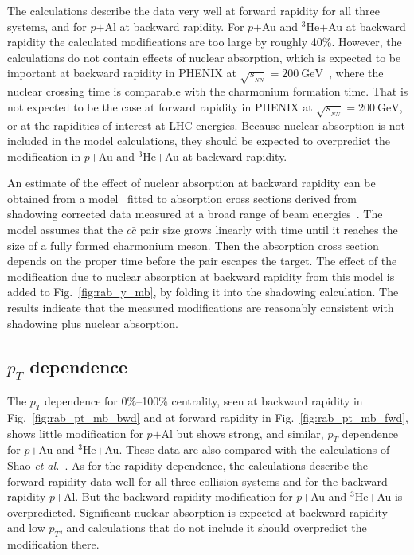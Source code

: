 \documentclass[twocolumn,letterpaper,aps,prc,longbibliography,superscriptaddress,nofootinbib,floatfix]{revtex4-1}
\newcommand{\pt}{\mbox{$p_T$}\xspace}
\newcommand{\sqsntwo}{\mbox{$\sqrt{s_{_{NN}}}=200~\mathrm{GeV}$}\xspace}
\newcommand{\pau}{\mbox{$p$$+$Au}\xspace}
\newcommand{\pal}{\mbox{$p$$+$Al}\xspace}
\newcommand{\heau}{\mbox{$^{3}$He$+$Au}\xspace}
\begin{document}
The calculations describe the data very well at forward rapidity for all 
three systems, and for \pal at backward rapidity. For \pau and \heau at 
backward rapidity the calculated modifications are too large by roughly 
40\%. However, the calculations do not contain effects of nuclear 
absorption, which is expected to be important at backward rapidity in 
PHENIX at \sqsntwo~\cite{McGlinchey:2012bp}, where the nuclear crossing 
time is comparable with the charmonium formation time. That is not 
expected to be the case at forward rapidity in PHENIX at \sqsntwo, or at 
the rapidities of interest at LHC energies. Because nuclear absorption 
is not included in the model calculations, they should be expected to 
overpredict the modification in \pau and \heau at backward rapidity.

An estimate of the effect of nuclear absorption at backward rapidity can 
be obtained from a model~\cite{Arleo:1999af} fitted to absorption cross 
sections derived from shadowing corrected data measured at a broad range 
of beam energies~\cite{McGlinchey:2012bp}. The model assumes that the 
$c\bar{c}$ pair size grows linearly with time until it reaches the size 
of a fully formed charmonium meson. Then the absorption cross section 
depends on the proper time before the pair escapes the target. The 
effect of the modification due to nuclear absorption at backward 
rapidity from this model is added to Fig.~\ref{fig:rab_y_mb}, by folding 
it into the shadowing calculation. The results indicate that the 
measured modifications are reasonably consistent with shadowing plus 
nuclear absorption.

\subsection{\pt dependence}

The \pt dependence for 0\%--100\% centrality, seen at backward rapidity 
in Fig.~\ref{fig:rab_pt_mb_bwd} and at forward rapidity in 
Fig.~\ref{fig:rab_pt_mb_fwd}, shows little modification for \pal but 
shows strong, and similar, \pt dependence for \pau and \heau. These data 
are also compared with the calculations of Shao \textit{et 
al.}~\cite{Kusina:2017gkz}. As for the rapidity dependence, the 
calculations describe the forward rapidity data well for all three 
collision systems and for the backward rapidity \pal. But the backward 
rapidity modification for \pau and \heau is overpredicted. Significant 
nuclear absorption is expected at backward rapidity and low \pt, and 
calculations that do not include it should overpredict the modification 
there.
\end{document}
